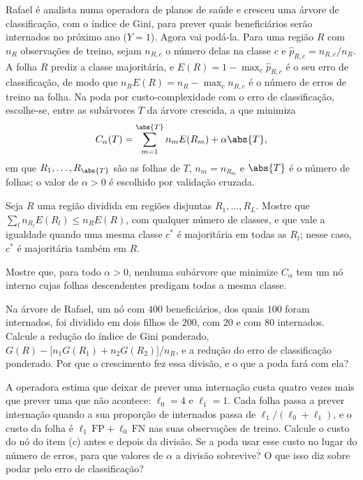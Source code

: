 Rafael é analista numa operadora de planos de saúde e cresceu uma árvore de classificação,
com o índice de Gini, para prever quais beneficiários serão internados no próximo ano
($Y=1$). Agora vai podá-la. Para uma região $R$ com $n_R$ observações de treino, sejam
$n_{R,c}$ o número delas na classe $c$ e $\widehat p_{R,c}=n_{R,c}/n_R$. A folha $R$ prediz a
classe majoritária, e $E(R)=1-\max_c\widehat p_{R,c}$ é o seu erro de classificação, de modo
que $n_RE(R)=n_R-\max_cn_{R,c}$ é o número de erros de treino na folha. Na poda por
custo-complexidade com o erro de classificação, escolhe-se, entre as subárvores $T$ da árvore
crescida, a que minimiza
\[
  C_\alpha(T)=\sum_{m=1}^{\abs{T}}n_mE(R_m)+\alpha\abs{T},
\]
em que $R_1,\dots,R_{\abs{T}}$ são as folhas de $T$, $n_m=n_{R_m}$ e $\abs{T}$ é o número de
folhas; o valor de $\alpha>0$ é escolhido por validação cruzada.
\begin{itens}
  \item {} Seja $R$ uma região dividida em regiões disjuntas $R_1,\dots,R_L$. Mostre
        que $\sum_ln_{R_l}E(R_l)\le n_RE(R)$, com qualquer número de classes, e que vale a
        igualdade quando uma mesma classe $c^*$ é majoritária em todas as $R_l$; nesse caso,
        $c^*$ é majoritária também em $R$.
  \item {} Mostre que, para todo $\alpha>0$, nenhuma subárvore que minimize $C_\alpha$
        tem um nó interno cujas folhas descendentes predigam todas a mesma classe.
  \item {} Na árvore de Rafael, um nó com $400$ beneficiários, dos quais $100$ foram
        internados, foi dividido em dois filhos de $200$, com $20$ e com $80$ internados.
        Calcule a redução do índice de Gini ponderado,
        $G(R)-\big[n_1G(R_1)+n_2G(R_2)\big]/n_R$, e a redução do erro de classificação
        ponderado. Por que o crescimento fez essa divisão, e o que a poda fará com ela?
  \item {} A operadora estima que deixar de prever uma internação custa quatro vezes
        mais que prever uma que não acontece: $\ell_0=4$ e $\ell_1=1$. Cada folha passa a
        prever internação quando a sua proporção de internados passa de
        $\ell_1/(\ell_0+\ell_1)$, e o custo da folha é $\ell_1\,\mathrm{FP}+\ell_0\,\mathrm{FN}$
        nas suas observações de treino. Calcule o custo do nó do item (c) antes e depois da
        divisão. Se a poda usar esse custo no lugar do número de erros, para que valores de
        $\alpha$ a divisão sobrevive? O que isso diz sobre podar pelo erro de classificação?
\end{itens}


